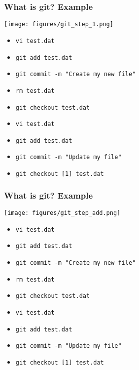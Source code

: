 \documentclass[xcolor=dvipsnames,10pt]{beamer}
\begin{document}
\begin{frame}
 \frametitle{What is git? Example}
 
 \begin{center}
  \texttt{[image: figures/git\_step\_1.png]}
 \end{center}
 \vspace*{-0.5cm}
 
 \begin{itemize}
  \item \texttt{vi test.dat}
  \color{white}
  \item[] \texttt{git add test.dat}
  \item[] \texttt{git commit -m "Create my new file"}
  \item[] \texttt{rm test.dat}
  \item[] \texttt{git checkout test.dat}
  \item[] \texttt{vi test.dat}
  \item[] \texttt{git add test.dat}
  \item[] \texttt{git commit -m "Update my file"}
  \item[] \texttt{git checkout [1] test.dat}
 \end{itemize}


\end{frame}
\addtocounter{framenumber}{-1}
\begin{frame}
 \frametitle{What is git? Example}
 
 \begin{center}
  \texttt{[image: figures/git\_step\_add.png]}
 \end{center}
 \vspace*{-0.5cm}
 
 \begin{itemize}
  \color{gray}
  \item[] \texttt{vi test.dat}
  \color{black}
  \item   \texttt{git add test.dat}
  \color{white}
  \item[] \texttt{git commit -m "Create my new file"}
  \item[] \texttt{rm test.dat}
  \item[] \texttt{git checkout test.dat}
  \item[] \texttt{vi test.dat}
  \item[] \texttt{git add test.dat}
  \item[] \texttt{git commit -m "Update my file"}
  \item[] \texttt{git checkout [1] test.dat}
 \end{itemize}


\end{frame}
\end{document}
